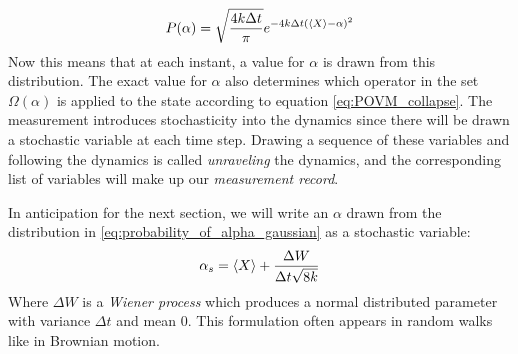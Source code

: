 \begin{equation}\label{eq:probability_of_alpha_gaussian}
    P(\alpha) = \sqrt{\frac{4 k \Delta t}{\pi}}  e^{-4k\Delta t (\expval{X} - \alpha)^2}
\end{equation}
Now this means that at each instant, a value for $\alpha$ is drawn from this distribution. The exact value for $\alpha$ also determines which operator in the set $\Omega(\alpha)$ is applied to the state according to equation \ref{eq:POVM_collapse}. 
The measurement introduces stochasticity into the dynamics since there will be drawn a stochastic variable at each time step. Drawing a sequence of these variables and following the dynamics is called \textit{unraveling} the dynamics, and the corresponding list of variables will make up our \textit{measurement record}. 

In anticipation for the next section, we will write an $\alpha$ drawn from the distribution in \ref{eq:probability_of_alpha_gaussian} as a stochastic variable:
\begin{equation}
    \alpha_s = \expval{X} + \frac{\Delta W}{\Delta t \sqrt{8k}}
\end{equation}
Where $\Delta W$ is a \textit{Wiener process} which produces a normal distributed parameter with variance $\Delta t$ and mean $0$. This formulation often appears in random walks like in Brownian motion\cite{jacobs_straightforward_2006}.


